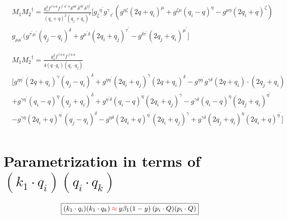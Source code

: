 \begin{equation}
\begin{split}
&M_1{M_2}^{\dagger}=\frac{g_s^2 f^{\:l\:o\:a} f^{\:f^{\prime}\: a^{\prime}\:n} \delta^{aa^{\prime}} \delta^{ob^{\prime}} \delta^{ff^{\prime}}}{(q_i +q)^2 (q_j +q_i)^2}
[{g_{{\zeta}}}^{{\eta}^{\prime}} {g^{\gamma}}_{{\tau}^{\prime}}(g^{{\eta}{\zeta}}(2q+q_i)^{\mu}+g^{{\zeta}{\mu}}(q_i -q)^{\eta}-g^{{\mu}{\eta}}(2q_i +q)^{\zeta})\\
&g_{{{\mu}}{{\mu}^{\prime}}}(g^{{{\tau}^{\prime}}{{\mu}^{\prime}}}(q_j-q_i)^{{\delta}}+g^{{{\mu}^{\prime}}{{\delta}}}(2q_i +q_j)^{{\tau}^{\prime}}-g^{{{\delta}}{{\tau}^{\prime}}}(2q_j+q_i)^{{\mu}^{\prime}}]
\end{split}
\end{equation}


\begin{equation}
\begin{split}
&M_1{M_2}^{\dagger}=\frac{g_s^2 f^{\:l\:o\:a} f^{\:f\: a\:n}}{4(q\cdot q_i) (q_i \cdot q_j)}\\
&[g^{{{\eta}}{{\eta}^{\prime}}}(2q+q_i)^{\gamma}(q_j-q_i)^{{\delta}}+g^{{{\eta}}{{\eta}^{\prime}}}(2q_i +q_j)^{\gamma}(2q+q_i)^{{\delta}}-g^{{{\eta}}{{\eta}^{\prime}}}g^{{{\gamma}}{{\delta}}}(2q+q_i)\cdot (2q_j+q_i)\\
&+g^{{{\gamma}}{{\eta}^{\prime}}}(q_i -q)^{\eta}(q_j+q_i)^{{\delta}}+g^{{{\eta}^{\prime}}{{\delta}}}(q_i -q)^{\eta}(2q_i +q_j)^{{\gamma}}
-g^{{{\gamma}}{{\delta}}}(q_i -q)^{\eta}(2q_j+q_i)^{{\eta}^{\prime}}\\
&-g^{{{\gamma}}{{\eta}}}(2q_i +q)^{{\eta}^{\prime}}(q_j-q_i)^{{\delta}}
-g^{{{\eta}}{{\delta}}}(2q_i +q)^{{\eta}^{\prime}}(2q_i +q_j)^{{\gamma}}
+g^{{{\gamma}}{{\delta}}}(2q_j+q_i)^{{\eta}}(2q_i +q)^{{\eta}^{\prime}}]\\
\end{split}
\end{equation}

\section{Parametrization in terms of $ (k_1 \cdot q_i )(q_i \cdot q_k) $}
\begin{equation}
	\begin{aligned}
		\fbox{$  (k_1 \cdot q_i )(k_1 \cdot q_k) {\color[RGB]{255,0,0} \: \approx\:} y\beta_1 (1-y)\:(p_i \cdot Q)(p_i \cdot Q) $}
    \end{aligned}
\end{equation}

